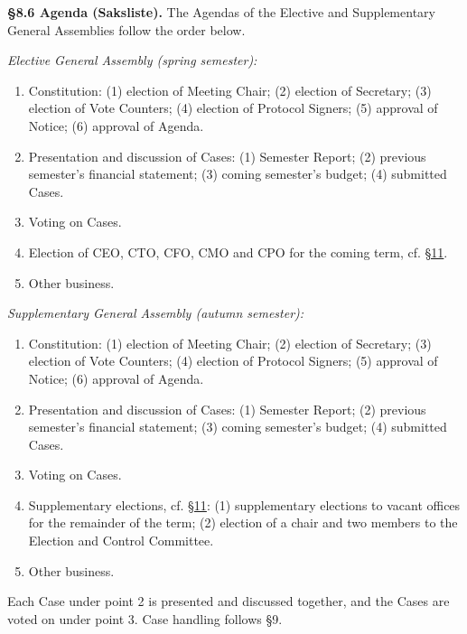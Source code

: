 \documentclass{../../../Common/Latex/Templates/rapport}
\begin{document}
\textbf{\S 8.6 Agenda (Saksliste).}\label{bylaw:8.6} The Agendas of the Elective and Supplementary General Assemblies follow the order below.

\emph{Elective General Assembly (spring semester):}
\begin{enumerate}
  \item Constitution: (1) election of Meeting Chair; (2) election of Secretary; (3) election of Vote Counters; (4) election of Protocol Signers; (5) approval of Notice; (6) approval of Agenda.
  \item Presentation and discussion of Cases: (1) Semester Report; (2) previous semester's financial statement; (3) coming semester's budget; (4) submitted Cases.
  \item Voting on Cases.
  \item Election of CEO, CTO, CFO, CMO and CPO for the coming term, cf. \hyperref[bylaw:11]{\S 11}.
  \item Other business.
\end{enumerate}

\emph{Supplementary General Assembly (autumn semester):}
\begin{enumerate}
  \item Constitution: (1) election of Meeting Chair; (2) election of Secretary; (3) election of Vote Counters; (4) election of Protocol Signers; (5) approval of Notice; (6) approval of Agenda.
  \item Presentation and discussion of Cases: (1) Semester Report; (2) previous semester's financial statement; (3) coming semester's budget; (4) submitted Cases.
  \item Voting on Cases.
  \item Supplementary elections, cf. \hyperref[bylaw:11]{\S 11}: (1) supplementary elections to vacant offices for the remainder of the term; (2) election of a chair and two members to the Election and Control Committee.
  \item Other business.
\end{enumerate}

Each Case under point 2 is presented and discussed together, and the Cases are voted on under point 3. Case handling follows \S9.
\end{document}
